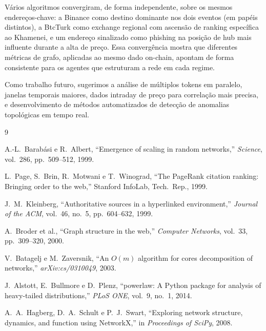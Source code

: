 \documentclass[12pt,a4paper]{article}
\begin{document}
Vários algoritmos convergiram, de forma independente, sobre os mesmos endereços-chave: a Binance como destino dominante nos dois eventos (em papéis distintos), a BtcTurk como exchange regional com ascensão de ranking específica ao Khamenei, e um endereço sinalizado como phishing na posição de hub mais influente durante a alta de preço. Essa convergência mostra que diferentes métricas de grafo, aplicadas ao mesmo dado on-chain, apontam de forma consistente para os agentes que estruturam a rede em cada regime.

Como trabalho futuro, sugerimos a análise de múltiplos tokens em paralelo, janelas temporais maiores, dados intraday de preço para correlação mais precisa, e desenvolvimento de métodos automatizados de detecção de anomalias topológicas em tempo real.

\begin{thebibliography}{9}

A.-L.\ Barabási e R.\ Albert, ``Emergence of scaling in random networks,'' \textit{Science}, vol.~286, pp.~509--512, 1999.

L.\ Page, S.\ Brin, R.\ Motwani e T.\ Winograd, ``The PageRank citation ranking: Bringing order to the web,'' Stanford InfoLab, Tech.\ Rep., 1999.

J.\ M.\ Kleinberg, ``Authoritative sources in a hyperlinked environment,'' \textit{Journal of the ACM}, vol.~46, no.~5, pp.~604--632, 1999.

A.\ Broder et al., ``Graph structure in the web,'' \textit{Computer Networks}, vol.~33, pp.~309--320, 2000.

V.\ Batagelj e M.\ Zaversnik, ``An $O(m)$ algorithm for cores decomposition of networks,'' \textit{arXiv:cs/0310049}, 2003.

J.\ Alstott, E.\ Bullmore e D.\ Plenz, ``powerlaw: A Python package for analysis of heavy-tailed distributions,'' \textit{PLoS ONE}, vol.~9, no.~1, 2014.

A.\ A.\ Hagberg, D.\ A.\ Schult e P.\ J.\ Swart, ``Exploring network structure, dynamics, and function using NetworkX,'' in \textit{Proceedings of SciPy}, 2008.

\end{thebibliography}
\end{document}
